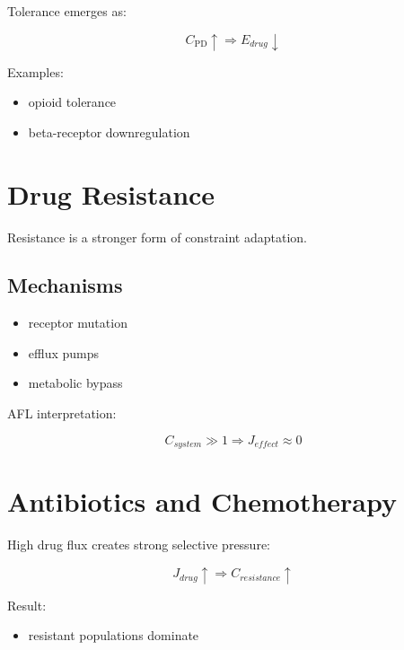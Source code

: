 \documentclass[11pt]{article}
\begin{document}
Tolerance emerges as:

\begin{equation}
C_{\mathrm{PD}} \uparrow \Rightarrow E_{drug} \downarrow
\end{equation}

Examples:

\begin{itemize}
    \item opioid tolerance
    \item beta-receptor downregulation
\end{itemize}

\section{Drug Resistance}

Resistance is a stronger form of constraint adaptation.

\subsection{Mechanisms}

\begin{itemize}
    \item receptor mutation
    \item efflux pumps
    \item metabolic bypass
\end{itemize}

AFL interpretation:

\begin{equation}
C_{system} \gg 1 \Rightarrow J_{effect} \approx 0
\end{equation}

\section{Antibiotics and Chemotherapy}

High drug flux creates strong selective pressure:

\begin{equation}
J_{drug} \uparrow \Rightarrow C_{resistance} \uparrow
\end{equation}

Result:

\begin{itemize}
    \item resistant populations dominate
\end{itemize}
\end{document}
